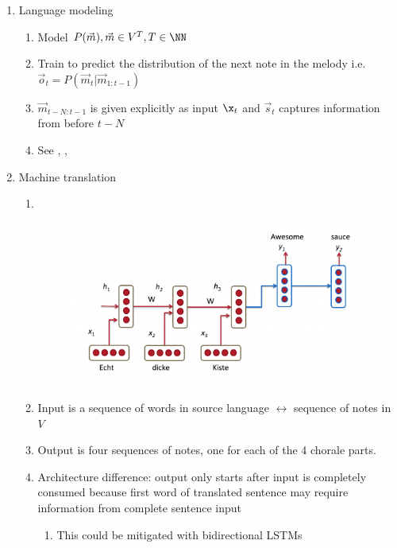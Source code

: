 \documentclass[a4paper,oneside,reqno,onecolumn]{amsart}
\newcommand{\m}{\vec{m}}
\newcommand{\s}{\vec{s}}
\renewcommand{\o}{\vec{o}}
\begin{document}
\begin{enumerate}
    \item Language modeling
        \begin{enumerate}
            \item Model $P(\m), \m \in V^T, T \in \NN$
            \item Train to predict the distribution of the next note in the
                melody i.e.\ $\o_t = P(\m_t | \m_{1:t-1})$
            \item $\m_{t-N:t-1}$ is given explicitly as input $\x_t$ and
                $\s_{t}$ captures information from before $t-N$
            \item See \cite{Martens2011}, \cite{Mikolov2011}, \cite{Mikolov2010}
        \end{enumerate}
    \item Machine translation
        \begin{enumerate}
            \item~\\
                \begin{figure}[htpb]
                    \centering
                    \includegraphics[width=0.8\linewidth]{Figures/rnn-mt.png}
                    \caption{}
                \end{figure}
            \item Input is a sequence of words in source language $\leftrightarrow$
                sequence of notes in $V$
            \item Output is four sequences of notes, one for each of the 4 chorale parts.
            \item Architecture difference: output only starts after input is completely
                consumed because first word of translated sentence may require information
                from complete sentence input
                \begin{enumerate}
                    \item This could be mitigated with bidirectional LSTMs \cite{Graves2005}

\end{enumerate}
\end{enumerate}
\end{enumerate}
\end{document}
